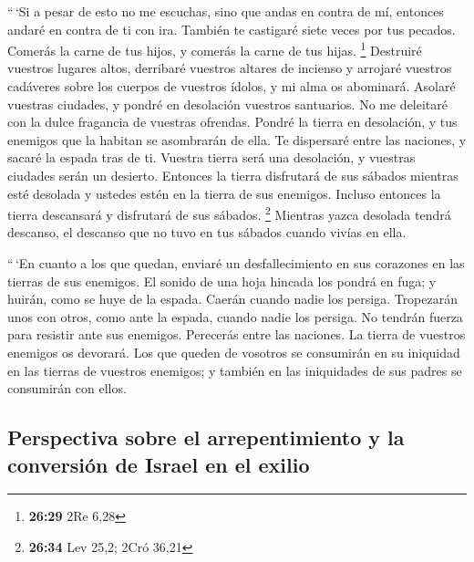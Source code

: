  ``\,`Si a pesar de esto no me escuchas, sino que andas
en contra de mí,  entonces andaré en contra de ti con
ira. También te castigaré siete veces por tus pecados. 
Comerás la carne de tus hijos, y comerás la carne de tus hijas.
\footnote{\textbf{26:29} 2Re 6,28}  Destruiré vuestros
lugares altos, derribaré vuestros altares de incienso y arrojaré
vuestros cadáveres sobre los cuerpos de vuestros ídolos, y mi alma os
abominará.  Asolaré vuestras ciudades, y pondré en
desolación vuestros santuarios. No me deleitaré con la dulce fragancia
de vuestras ofrendas.  Pondré la tierra en desolación, y
tus enemigos que la habitan se asombrarán de ella.  Te
dispersaré entre las naciones, y sacaré la espada tras de ti. Vuestra
tierra será una desolación, y vuestras ciudades serán un desierto.
 Entonces la tierra disfrutará de sus sábados mientras
esté desolada y ustedes estén en la tierra de sus enemigos. Incluso
entonces la tierra descansará y disfrutará de sus sábados. \footnote{\textbf{26:34}
  Lev 25,2; 2Cró 36,21}  Mientras yazca desolada tendrá
descanso, el descanso que no tuvo en tus sábados cuando vivías en ella.

 ``\,`En cuanto a los que quedan, enviaré un
desfallecimiento en sus corazones en las tierras de sus enemigos. El
sonido de una hoja hincada los pondrá en fuga; y huirán, como se huye de
la espada. Caerán cuando nadie los persiga.  Tropezarán
unos con otros, como ante la espada, cuando nadie los persiga. No
tendrán fuerza para resistir ante sus enemigos. 
Perecerás entre las naciones. La tierra de vuestros enemigos os
devorará.  Los que queden de vosotros se consumirán en su
iniquidad en las tierras de vuestros enemigos; y también en las
iniquidades de sus padres se consumirán con ellos.

\hypertarget{perspectiva-sobre-el-arrepentimiento-y-la-conversiuxf3n-de-israel-en-el-exilio}{%
\subsection{Perspectiva sobre el arrepentimiento y la conversión de
Israel en el
exilio}\label{perspectiva-sobre-el-arrepentimiento-y-la-conversiuxf3n-de-israel-en-el-exilio}}


